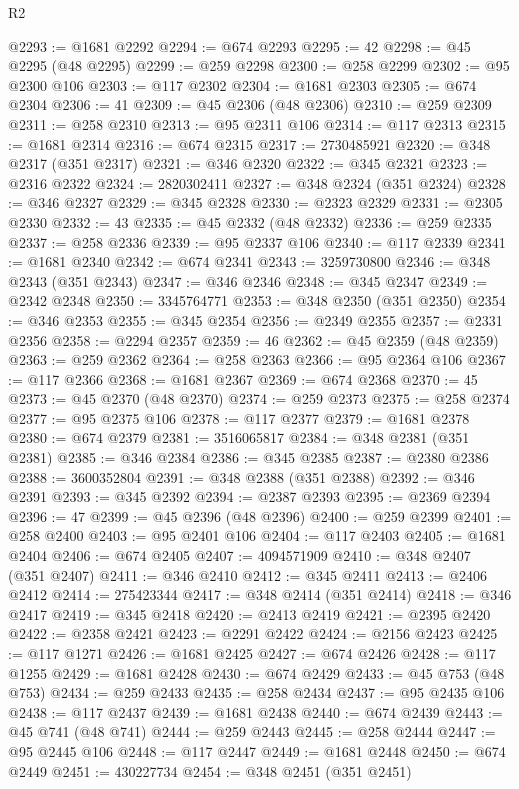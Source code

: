 \begin{lexlean}{R2}
\begin{coremodule}
@2293 := @1681 @2292
@2294 := @674 @2293
@2295 := 42
@2298 := @45 @2295 (@48 @2295)
@2299 := @259 @2298
@2300 := @258 @2299
@2302 := @95 @2300 @106
@2303 := @117 @2302
@2304 := @1681 @2303
@2305 := @674 @2304
@2306 := 41
@2309 := @45 @2306 (@48 @2306)
@2310 := @259 @2309
@2311 := @258 @2310
@2313 := @95 @2311 @106
@2314 := @117 @2313
@2315 := @1681 @2314
@2316 := @674 @2315
@2317 := 2730485921
@2320 := @348 @2317 (@351 @2317)
@2321 := @346 @2320
@2322 := @345 @2321
@2323 := @2316 @2322
@2324 := 2820302411
@2327 := @348 @2324 (@351 @2324)
@2328 := @346 @2327
@2329 := @345 @2328
@2330 := @2323 @2329
@2331 := @2305 @2330
@2332 := 43
@2335 := @45 @2332 (@48 @2332)
@2336 := @259 @2335
@2337 := @258 @2336
@2339 := @95 @2337 @106
@2340 := @117 @2339
@2341 := @1681 @2340
@2342 := @674 @2341
@2343 := 3259730800
@2346 := @348 @2343 (@351 @2343)
@2347 := @346 @2346
@2348 := @345 @2347
@2349 := @2342 @2348
@2350 := 3345764771
@2353 := @348 @2350 (@351 @2350)
@2354 := @346 @2353
@2355 := @345 @2354
@2356 := @2349 @2355
@2357 := @2331 @2356
@2358 := @2294 @2357
@2359 := 46
@2362 := @45 @2359 (@48 @2359)
@2363 := @259 @2362
@2364 := @258 @2363
@2366 := @95 @2364 @106
@2367 := @117 @2366
@2368 := @1681 @2367
@2369 := @674 @2368
@2370 := 45
@2373 := @45 @2370 (@48 @2370)
@2374 := @259 @2373
@2375 := @258 @2374
@2377 := @95 @2375 @106
@2378 := @117 @2377
@2379 := @1681 @2378
@2380 := @674 @2379
@2381 := 3516065817
@2384 := @348 @2381 (@351 @2381)
@2385 := @346 @2384
@2386 := @345 @2385
@2387 := @2380 @2386
@2388 := 3600352804
@2391 := @348 @2388 (@351 @2388)
@2392 := @346 @2391
@2393 := @345 @2392
@2394 := @2387 @2393
@2395 := @2369 @2394
@2396 := 47
@2399 := @45 @2396 (@48 @2396)
@2400 := @259 @2399
@2401 := @258 @2400
@2403 := @95 @2401 @106
@2404 := @117 @2403
@2405 := @1681 @2404
@2406 := @674 @2405
@2407 := 4094571909
@2410 := @348 @2407 (@351 @2407)
@2411 := @346 @2410
@2412 := @345 @2411
@2413 := @2406 @2412
@2414 := 275423344
@2417 := @348 @2414 (@351 @2414)
@2418 := @346 @2417
@2419 := @345 @2418
@2420 := @2413 @2419
@2421 := @2395 @2420
@2422 := @2358 @2421
@2423 := @2291 @2422
@2424 := @2156 @2423
@2425 := @117 @1271
@2426 := @1681 @2425
@2427 := @674 @2426
@2428 := @117 @1255
@2429 := @1681 @2428
@2430 := @674 @2429
@2433 := @45 @753 (@48 @753)
@2434 := @259 @2433
@2435 := @258 @2434
@2437 := @95 @2435 @106
@2438 := @117 @2437
@2439 := @1681 @2438
@2440 := @674 @2439
@2443 := @45 @741 (@48 @741)
@2444 := @259 @2443
@2445 := @258 @2444
@2447 := @95 @2445 @106
@2448 := @117 @2447
@2449 := @1681 @2448
@2450 := @674 @2449
@2451 := 430227734
@2454 := @348 @2451 (@351 @2451)

\end{coremodule}
\end{lexlean}

